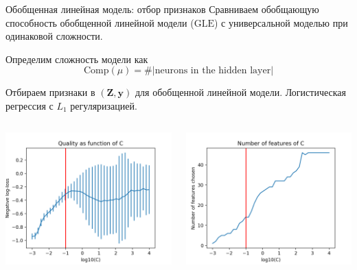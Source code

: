\documentclass{beamer}
\newcommand{\by}{\mathbf{y}}
\newcommand{\bZ}{\mathbf{Z}}
\begin{document}
\begin{frame}{Обобщенная линейная модель: отбор признаков}
    Сравниваем обобщающую способность обобщенной линейной модели ($\mathrm{GLE}$)
    с универсальной
    моделью при одинаковой сложности.

    Определим сложность модели как
    $$
        \mathrm{Comp}(\mu) = \#|\text{neurons in the hidden layer}|
    $$

    Отбираем признаки в $(\bZ, \by)$ для обобщенной линейной модели. Логистическая
    регрессия с $L_1$ регуляризацией.
    \begin{columns}
        \begin{column}{.5\textwidth}
            \begin{center}
                \includegraphics[width=\textwidth]{../pics/lr_quality_C.png}
            \end{center}
        \end{column}
        \begin{column}{.5\textwidth}
            \begin{center}
                \includegraphics[width=\textwidth]{../pics/lr_n_features_C.png}

\end{center}
\end{column}
\end{columns}
\end{frame}
\end{document}
